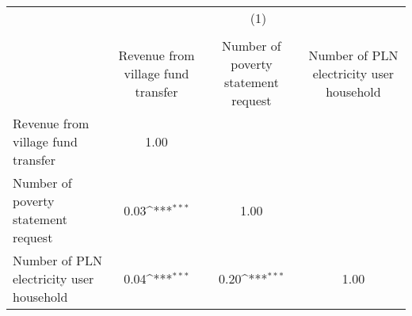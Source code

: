 {
\def\sym#1{\ifmmode^{#1}\else\(^{#1}\)\fi}
\begin{tabular}{l*{3}{c}}
\hline\hline
                &\multicolumn{3}{c}{(1)}                                 \\
                &\multicolumn{3}{c}{}                                    \\
                &\hspace{0.25cm} Revenue from village fund transfer         &\hspace{0.25cm} Number of poverty statement request         &\hspace{0.25cm} Number of PLN electricity user household         \\
\hline
\hspace{0.25cm} Revenue from village fund transfer&     1.00         &                  &                  \\
\hspace{0.25cm} Number of poverty statement request&     0.03\sym{***}&     1.00         &                  \\
\hspace{0.25cm} Number of PLN electricity user household&     0.04\sym{***}&     0.20\sym{***}&     1.00         \\
\hline\hline
\end{tabular}
}
